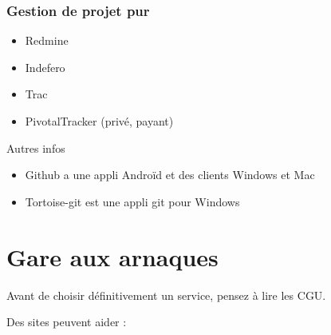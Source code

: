 \documentclass{beamer}
\begin{document}
\begin{frame}
    \frametitle{Gestion de projet pur}

    \begin{itemize}
        \item Redmine
        \item Indefero
        \item Trac
        \item PivotalTracker (privé, payant)
    \end{itemize}

    \pause

    \begin{block}{Autres infos}
        \begin{itemize}
            \item Github a une appli Androïd et des clients Windows et Mac
            \item Tortoise-git est une appli git pour Windows
        \end{itemize}
    \end{block}
\end{frame}

\section{Gare aux arnaques} %

\begin{frame}

    Avant de choisir définitivement un service, pensez à lire les CGU.

    \pause{}

    Des sites peuvent aider :


\end{frame}
\end{document}
